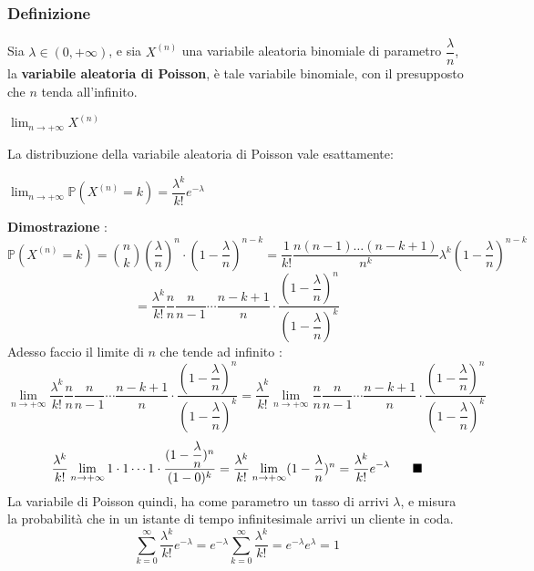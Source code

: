 \documentclass[12pt, letterpaper]{article}
\newcommand{\Prob}{{\mathbb P}}
\begin{document}
\subsubsection{Definizione}
Sia \(\lambda\in (0,+\infty)\), e sia \(X^{(n)}\) una variabile aleatoria binomiale di parametro \(\dfrac{\lambda}{n}\), 
la \textbf{variabile aleatoria di Poisson}, è tale variabile binomiale, con il presupposto che \(n\) tenda all'infinito.\begin{center}
    \( \displaystyle\lim_{n\rightarrow+\infty} X^{(n)} \)
\end{center}
La distribuzione della variabile aleatoria di Poisson vale esattamente:\begin{center} \(\displaystyle\lim_{n\rightarrow+\infty}\Prob(X^{(n)}=k)=\dfrac{\lambda^k}{k!}e^{-\lambda}\)
\end{center}
\textbf{Dimostrazione }: \begin{equation}
    \Prob(X^{(n)}=k)=\binom{n}{k}(\dfrac{\lambda}{n})^n\cdot(1-\dfrac{\lambda}{n})^{n-k}=\dfrac{1}{k!}
    \dfrac{n(n-1)\dots (n-k+1)}{n^k}\lambda^k(1-\dfrac{\lambda}{n})^{n-k}
\end{equation}\begin{equation}
    =\dfrac{\lambda^k}{k!}\dfrac{n}{n}\dfrac{n}{n-1}\cdots \dfrac{n-k+1}{n}\cdot\dfrac{(1-\dfrac{\lambda}{n})^n}{(1-\dfrac{\lambda}{n})^k}
\end{equation}
Adesso faccio il limite di \(n\) che tende ad infinito :\begin{equation}
    \lim_{n\rightarrow+\infty}\dfrac{\lambda^k}{k!}\dfrac{n}{n}\dfrac{n}{n-1}\cdots \dfrac{n-k+1}{n}\cdot\dfrac{(1-\dfrac{\lambda}{n})^n}{(1-\dfrac{\lambda}{n})^k}=
    \dfrac{\lambda^k}{k!}\lim_{n\rightarrow+\infty}\dfrac{n}{n}\dfrac{n}{n-1}\cdots \dfrac{n-k+1}{n}\cdot\dfrac{(1-\dfrac{\lambda}{n})^n}{(1-\dfrac{\lambda}{n})^k}
\end{equation}\begin{equation}
    \dfrac{\lambda^k}{k!}\lim_{n\rightarrow+\infty}1\cdot 1\cdots 1 \cdot \dfrac{(1-\dfrac{\lambda}{n})^n}{(1-0)^k}=\dfrac{\lambda^k}{k!}\lim_{n\rightarrow+\infty}(1-\dfrac{\lambda}{n})^n=\dfrac{\lambda^k}{k!}e^{-\lambda}\text{\hphantom{text}}\blacksquare
\end{equation}
La variabile di Poisson quindi, ha come parametro un tasso di arrivi \(\lambda\), e misura la probabilità 
che in un istante di tempo infinitesimale arrivi un cliente in coda.\begin{equation}
    \sum_{k=0}^\infty\dfrac{\lambda^k}{k!}e^{-\lambda}=e^{-\lambda}\sum_{k=0}^\infty\dfrac{\lambda^k}{k!}=e^{-\lambda}e^{\lambda}=1
\end{equation}
\end{document}
